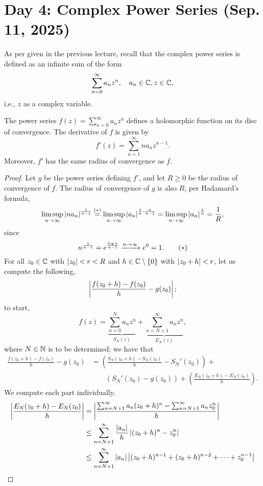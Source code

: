 \section{Day 4: Complex Power Series (Sep. 11, 2025)}
As per given in the previous lecture, recall that the complex power series is defined as an infinite sum of the form
\[ \sum_{n=0}^\infty a_n z^n, \quad a_n \in \mathbb C, z \in \mathbb C, \]
i.e., $z$ as a complex variable.
\begin{theorem}
    The power series $f(z) = \sum_{n=0}^\infty a_nz^n$ defines a holomorphic function on its disc of convergence. The derivative of $f$ is given by
    \[ f'(z) = \sum_{n=1}^\infty n a_n z^{n-1}. \]
    Moreover, $f'$ has the same radius of convergence as $f$.
\end{theorem}
\begin{proof}
    Let $g$ be the power series defining $f'$, and let $R \geq 0$ be the radius of convergence of $f$. The radius of convergence of $g$ is also $R$, per Hadamard's formula,
    \[ \limsup_{n \to \infty} \left\lvert n a_n \right\rvert^{\frac{1}{n-1}} \stackrel{(\ast)}{=} \limsup_{n \to \infty} \left\lvert a_n \right\rvert^{\frac{1}{n} \cdot \frac{n}{n-1}} = \limsup_{n \to \infty} \left\lvert a_n \right\rvert^{\frac{1}{n}} = \frac{1}{R}, \]
    since
    \[ n^{\frac{1}{n-1}} = e^{\frac{\log n}{n-1}} \xrightarrow{n \to \infty} e^0 = 1. \tag{$\ast$} \]
    For all $z_0 \in \mathbb C$ with $\left\lvert z_0 \right\rvert < r < R$ and $h \in \mathbb C \setminus \{0\}$ with $\left\lvert z_0 + h \right\rvert < r$, let us compute the following,
    \[ \left\lvert \frac{f(z_0 + h) - f(z_0)}{h} - g(z_0) \right\rvert; \]
    to start,
    \[ f(z) = \underbrace{\sum_{n=0}^N a_nz^n}_{S_N(z)} + \underbrace{\sum_{n=N+1}^\infty a_nz^n}_{E_N(z)}, \]
    where $N \in \mathbb N$ is to be determined; we have that
    \begin{align*}
        \frac{f(z_0 + h) - f(z_0)}{h} - g(z_0) &= \left(\frac{S_N(z_0 + h) - S_N(z_0)}{h} - S_N'(z_0)\right) + \\
        & \qquad \left(S_N'(z_0) - g(z_0)\right) + \left(\frac{E_N(z_0 + h) - E_N(z_0)}{h}\right).
    \end{align*}
    We compute each part individually.
    \begin{align*}
        \abs{\frac{E_N(z_0 + h) - E_N(z_0)}{h}} &= \abs{\frac{\sum_{n={N+1}}^\infty a_n(z_0 + h)^n - \sum_{n=N+1}^\infty a_n z_0^n}{h}} \\
        &\leq \sum_{n=N+1}^\infty \frac{\abs{a_n}}{h} \abs{(z_0 + h)^n - z_0^n} \\
        &\leq \sum_{n=N+1}^\infty \abs{a_n} \abs{(z_0 + h)^{n-1} + (z_0 + h)^{n-2} + \dots + z_0^{n-1}} \\

\end{align*}
\end{proof}
